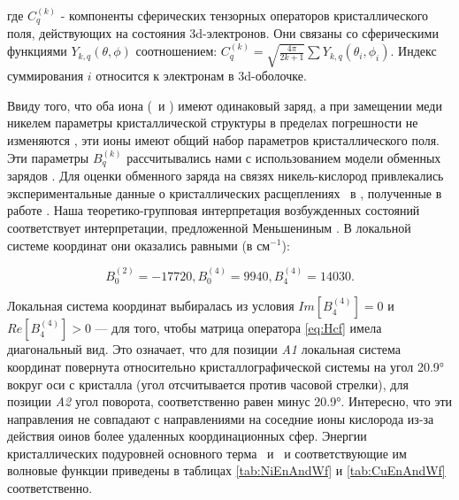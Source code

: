 где $C_{q}^{(k)}$ - компоненты сферических тензорных операторов кристаллического поля, действующих на состояния 3d-электронов. Они связаны со сферическими функциями $Y_{k,q}\left( \theta,\phi \right)$ соотношением: $C_{q}^{(k)}=\sqrt{\frac{4\pi}{2k+1}}\sum Y_{k,q}\left( \theta_{i},\phi_{i} \right)$. Индекс суммирования $i$ относится к электронам в 3d-оболочке.

Ввиду того, что оба иона (\cu\ и \niIon) имеют одинаковый заряд, а при замещении меди никелем параметры кристаллической структуры в пределах погрешности не изменяются \cite{Khan2013}, эти ионы имеют общий набор параметров кристаллического поля.
Эти параметры $B_{q}^{(k)}$ рассчитывались нами с использованием модели обменных зарядов \cite{Malkin1987}. Для оценки обменного заряда на связях никель-кислород привлекались экспериментальные данные о кристаллических расщеплениях \cu\ в \cbo, полученные в работе \cite{Pisarev2011}. Наша теоретико-групповая интерпретация возбужденных состояний соответствует интерпретации, предложенной Меньшениным \cite{Menshenin2017}. В локальной системе координат они оказались равными (в см$^{-1}$):

\begin{equation}
	\label{eq:CrystParams}
	B_{0}^{(2)}=-17720, B_{0}^{(4)}=9940, B_{4}^{(4)}=14030.
\end{equation}

Локальная система координат выбиралась из условия $Im\left[ B_{4}^{(4)} \right]=0$ и $Re\left[ B_{4}^{(4)} \right]>0$ --- для того, чтобы матрица оператора \cref{eq:Hcf} имела диагональный вид. Это означает, что для позиции \textit{A1} локальная система координат повернута относительно кристаллографической системы на угол \ang{20.9} вокруг оси с кристалла (угол отсчитывается против часовой стрелки), для позиции \textit{A2} угол поворота, соответственно равен минус \ang{20.9}. Интересно, что эти направления не совпадают с направлениями на соседние ионы кислорода из-за действия оинов более удаленных координационных сфер. Энергии кристаллических подуровней основного терма \cud\ и \nif\ и соответствующие им волновые функции приведены в таблицах \cref{tab:NiEnAndWf} и \cref{tab:CuEnAndWf} соответственно.

